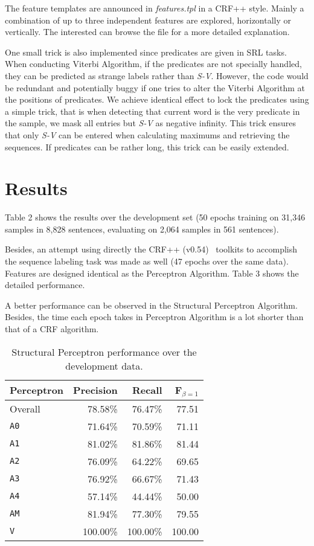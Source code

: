 \documentclass[11pt,a4paper]{article}
\begin{document}
The feature templates are announced in \textit{features.tpl} in a CRF++ style. Mainly a combination of up to three independent features are explored, horizontally or vertically. The interested can browse the file for a more detailed explanation.

One small trick is also implemented since predicates are given in SRL tasks. When conducting Viterbi Algorithm, if the predicates are not specially handled, they can be predicted as strange labels rather than \textit{S-V}. However, the code would be redundant and potentially buggy if one tries to alter the Viterbi Algorithm at the positions of predicates. We achieve identical effect to lock the predicates using a simple trick, that is when detecting that current word is the very predicate in the sample, we mask all entries but \textit{S-V} as negative infinity. This trick ensures that only \textit{S-V} can be entered when calculating maximums and retrieving the sequences. If predicates can be rather long, this trick can be easily extended.

\section{Results}

Table 2 shows the results over the development set (50 epochs training on 31,346 samples in 8,828 sentences, evaluating on 2,064 samples in 561 sentences).

Besides, an attempt using directly the CRF++ (v0.54)~\citep{crf} toolkits to accomplish the sequence labeling task was made as well (47 epochs over the same data). Features are designed identical as the Perceptron Algorithm. Table 3 shows the detailed performance.

A better performance can be observed in the Structural Perceptron Algorithm. Besides, the time each epoch takes in Perceptron Algorithm is a lot shorter than that of a CRF algorithm.

\begin{table}
\label{tab2}
\centering
\begin{tabular}{|l|r|r|r|}\cline{2-4}
\multicolumn{1}{c|}{Perceptron}
           & Precision & Recall & F$_{\beta=1}$\\
\hline
Overall            &  78.58\% &  76.47\% &  77.51\\
\hline
\texttt{A0}        &  71.64\% &  70.59\% &  71.11\\
\texttt{A1}        &  81.02\% &  81.86\% &  81.44\\
\texttt{A2}        &  76.09\% &  64.22\% &  69.65\\
\texttt{A3}        &  76.92\% &  66.67\% &  71.43\\
\texttt{A4}        &  57.14\% &  44.44\% &  50.00\\
\texttt{AM}        &  81.94\% &  77.30\% &  79.55\\
\hline
\hline
\texttt{V}         & 100.00\% & 100.00\% & 100.00\\
\hline
\end{tabular}
\caption{Structural Perceptron performance over the development data.
  }
\end{table}
\end{document}
